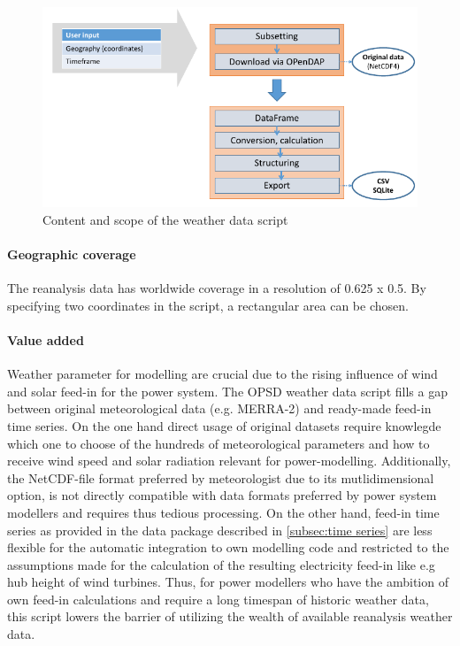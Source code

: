 \documentclass[article]{elsarticle}
\begin{document}
\begin{figure}[!h]
    \centering
    \includegraphics[width=1\textwidth]{figures/weather_data.png}
    \caption{Content and scope of the weather data script}
    \label{fig:weather data}
\end{figure}

\paragraph{Geographic coverage}
The reanalysis data has worldwide coverage in a resolution of 0.625 x 0.5. By specifying two coordinates in the script, a rectangular area can be chosen.

\paragraph{Value added}
Weather parameter for modelling are crucial due to the rising influence of wind and solar feed-in for the power system. The OPSD weather data script fills a gap between original meteorological data (e.g. MERRA-2) and ready-made feed-in time series. On the one hand direct usage of original datasets require knowlegde which one to choose of the hundreds of meteorological parameters and how to receive wind speed and solar radiation relevant for power-modelling. Additionally, the NetCDF-file format preferred by meteorologist due to its mutlidimensional option, is not directly compatible with data formats preferred by power system modellers and requires thus tedious processing. On the other hand, feed-in time series as provided in the data package described in \ref{subsec:time series} are less flexible for the automatic integration to own modelling code and restricted to the assumptions made for the calculation of the resulting electricity feed-in like e.g hub height of wind turbines. Thus, for power modellers who have the ambition of own feed-in calculations and require a long timespan of historic weather data, this script lowers the barrier of utilizing the wealth of available reanalysis weather data.
        
\end{document}
